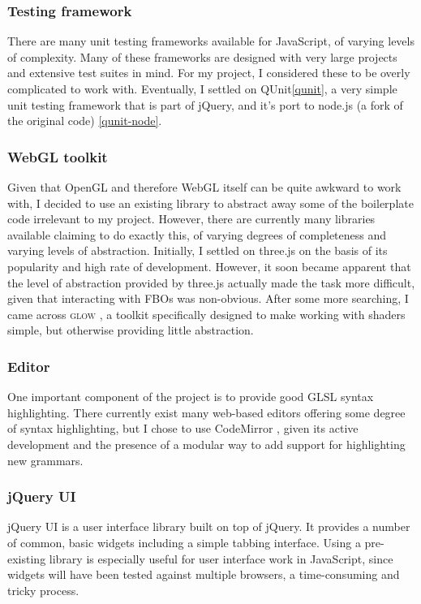 \documentclass[12pt,twoside,notitlepage]{report}
\begin{document}
\subsubsection{Testing framework}
There are many unit testing frameworks available for JavaScript, of varying levels of complexity. Many of these frameworks are designed with very large projects and extensive test suites in mind. For my project, I considered these to be overly complicated to work with. Eventually, I settled on QUnit\ref{qunit}, a very simple unit testing framework that is part of jQuery, and it's port to node.js (a fork of the original code) \ref{qunit-node}.

\subsubsection{WebGL toolkit}
Given that OpenGL and therefore WebGL itself can be quite awkward to work with, I decided to use an existing library to abstract away some of the boilerplate code irrelevant to my project. However, there are currently many libraries available claiming to do exactly this, of varying degrees of completeness and varying levels of abstraction. Initially, I settled on three.js \citet{three} on the basis of its popularity and high rate of development. However, it soon became apparent that the level of abstraction provided by three.js actually made the task more difficult, given that interacting with FBOs was non-obvious. After some more searching, I came across \textsc{glow} \citet{glow}, a toolkit specifically designed to make working with shaders simple, but otherwise providing little abstraction.

\subsubsection{Editor}
\label{cmirror}
One important component of the project is to provide good GLSL syntax highlighting. There currently exist many web-based editors offering some degree of syntax highlighting, but I chose to use CodeMirror \citet{codemirror}, given its active development and the presence of a modular way to add support for highlighting new grammars. 

\subsubsection{jQuery UI}
jQuery UI is a user interface library built on top of jQuery. It provides a number of common, basic widgets including a simple tabbing interface. Using a pre-existing library is especially useful for user interface work in JavaScript, since widgets will have been tested against multiple browsers, a time-consuming and tricky process.
\end{document}
